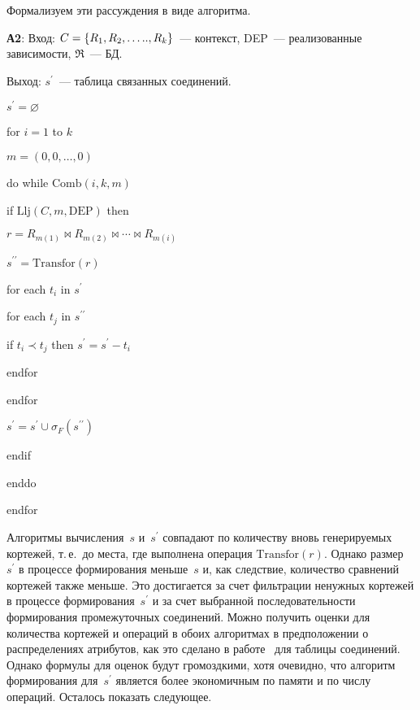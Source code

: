 \begin{multicols}{2}
  Формализуем эти рассуждения в виде алго\-ритма.
  
  \smallskip
  
\noindent
\textbf{А2}: Вход: $C\hm=\{R_1, R_2, \ldots .., R_k\}$~--- контекст, DEP~--- 
реализованные зависимости, $\Re$~--- БД.

\noindent
Выход: $s^\prime$~--- таблица связанных соединений.


\noindent
$s^\prime=\varnothing$

\noindent
for $i=1$ to $k$

$m=(0,0,\ldots ,0)$

do while $\mathrm{Comb}\left(i,k,m\right)$

\hspace*{1mm}if $\mathrm{Llj}\left(C,m,\mathrm{DEP}\right)$ then

\hspace*{2mm}$r = R_{m(1)}\bowtie R_{m(2)}\bowtie\cdots\bowtie R_{m(i)}$

\hspace*{2mm}$s^{\prime\prime}=\mathrm{Transfor}(r)$

\hspace*{2mm}for each $t_i$ in $s^\prime$

\hspace*{3mm}for each $t_j$ in $s^{\prime\prime}$

\hspace*{4mm}if $t_i \prec t_j$ then $s^\prime=s^\prime - t_i$

\hspace*{3mm}endfor

\hspace*{2mm}endfor

\hspace*{2mm}$s^\prime=s^\prime \cup  \sigma_F(s^{\prime\prime})$

\hspace*{1mm}endif

enddo

\noindent
endfor
  
  \smallskip
  
  Алгоритмы вычисления~$s$ и~$s^\prime$ совпадают по количеству вновь 
генерируемых кортежей, т.\,е.\ до мес\-та, где выполнена операция $\mathrm{Transfor}(r)$. 
Однако размер~$s^\prime$ в процессе формирования меньше~$s$ и, как 
следствие, количество сравнений кортежей также меньше. Это достигается за 
счет фильтрации ненужных кортежей в процессе формирования~$s^\prime$ и за 
счет выбранной последовательности формирования промежуточных 
соединений. Можно получить оценки для количества кортежей и операций в 
обоих алгоритмах в предположении о распределениях атрибутов, как это 
сделано в работе~\cite{18-z} для таб\-ли\-цы соединений. Однако формулы для 
оценок будут громоздкими, хотя очевидно, что алгоритм формирования 
для~$s^\prime$ является более экономичным по памяти и по числу операций. 
Осталось показать следующее.
  

\end{multicols}
